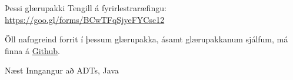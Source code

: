 \documentclass[handout]{beamer}
\begin{document}
\begin{frame}{Þessi glærupakki}
Tengill á fyrirlestraræfingu: \url{https://goo.gl/forms/BCwTFqSjyeFYCsc12}
\vspace{1cm}

Öll nafngreind forrit í þessum glærupakka, ásamt glærupakkanum sjálfum, má finna á  \href{https://github.com/Ernir/kennsluefni/tree/master/T2/Code/w3}{Github}.
\end{frame}


\begin{frame}{Næst}
Inngangur að ADTs, Java
\end{frame}
\end{document}
